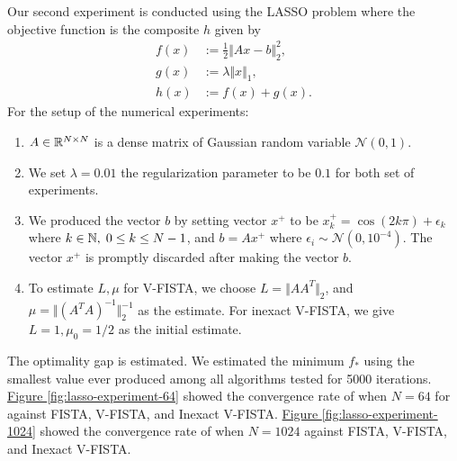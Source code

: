 \documentclass[12pt]{article}
\begin{document}
        Our second experiment is conducted using the LASSO problem where the objective function is the composite $h$ given by
        \begin{align*}
            f(x) &:= \frac{1}{2} \Vert Ax - b\Vert^2_2, 
            \\
            g(x) &:= \lambda \Vert x\Vert_1, 
            \\
            h(x) &:= f(x) + g(x). 
        \end{align*}
        For the setup of the numerical experiments: 
        \begin{enumerate}
            \item $A\in \mathbb R^{N\times N}$ is a dense matrix of Gaussian random variable $\mathcal N(0, 1)$. 
            \item We set $\lambda=0.01$ the regularization parameter to be $0.1$ for both set of experiments. 
            \item We produced the vector $b$ by setting vector $x^+$ to be $x^+_k = \cos(2k\pi) + \epsilon_k$ where $k\in \mathbb N, \;0 \le k \le N-1$, and $b = Ax^+$ where $\epsilon_i \sim \mathcal N(0, 10^{-4})$. The vector $x^+$ is promptly discarded after making the vector $b$. 
            \item To estimate $L, \mu$ for V-FISTA, we choose $L = \Vert AA^T\Vert_2$, and $\mu = \Vert (A^TA)^{-1}\Vert^{-1}_2$ as the estimate. For inexact V-FISTA, we give $L=1, \mu_0 = 1/2$ as the initial estimate. 
        \end{enumerate}
        The optimality gap is estimated. 
        We estimated the minimum $f_*$ using the smallest value ever produced among all algorithms tested for 5000 iterations. 
        \hyperref[fig:lasso-experiment-64]{Figure \ref*{fig:lasso-experiment-64}} showed the convergence rate of when $N=64$ for against FISTA, V-FISTA, and Inexact V-FISTA. 
        \hyperref[fig:lasso-experiment-1024]{Figure \ref*{fig:lasso-experiment-1024}} showed the convergence rate of when $N=1024$ against FISTA, V-FISTA, and Inexact V-FISTA. 
\end{document}
